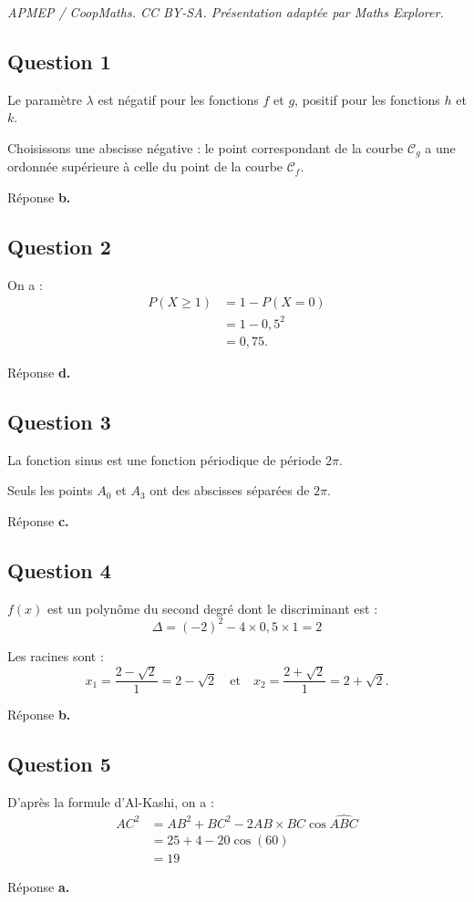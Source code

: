 \documentclass[10pt]{article}
\begin{document}
\noindent\textit{APMEP / CoopMaths. CC BY-SA. Présentation adaptée par Maths Explorer.}\par\medskip
\subsection*{Question 1}

Le paramètre \( \lambda \) est négatif pour les fonctions \(f\) et \(g\), positif pour les fonctions \(h\) et \(k\).

Choisissons une abscisse négative : le point correspondant de la courbe \(\mathcal{C}_g\) a une ordonnée supérieure à celle du point de la courbe \(\mathcal{C}_f\).

Réponse \textbf{b.}

\subsection*{Question 2}

On a :
\begin{align*}
P(X \geqslant 1) &= 1 - P(X = 0) \\
&= 1 - 0{,}5^2 \\
&= 0{,}75.
\end{align*}

Réponse \textbf{d.}

\subsection*{Question 3}

La fonction sinus est une fonction périodique de période \(2\pi\).

Seuls les points \(A_0\) et \(A_3\) ont des abscisses séparées de \(2\pi\).

Réponse \textbf{c.}

\subsection*{Question 4}

\( f(x) \) est un polynôme du second degré dont le discriminant est :
\[
\Delta = (-2)^2 - 4 \times 0{,}5 \times 1 = 2
\]

Les racines sont :
\[
x_1 = \dfrac{2 - \sqrt{2}}{1} = 2 - \sqrt{2} \quad \text{et} \quad x_2 = \dfrac{2 + \sqrt{2}}{1} = 2 + \sqrt{2}.
\]

Réponse \textbf{b.}

\subsection*{Question 5}

D'après la formule d'Al-Kashi, on a :
\begin{align*}
AC^2 &= AB^2 + BC^2 - 2AB \times BC \cos \widehat{ABC} \\
&= 25 + 4 - 20 \cos(60) \\
&= 19
\end{align*}

Réponse \textbf{a.}
\end{document}
